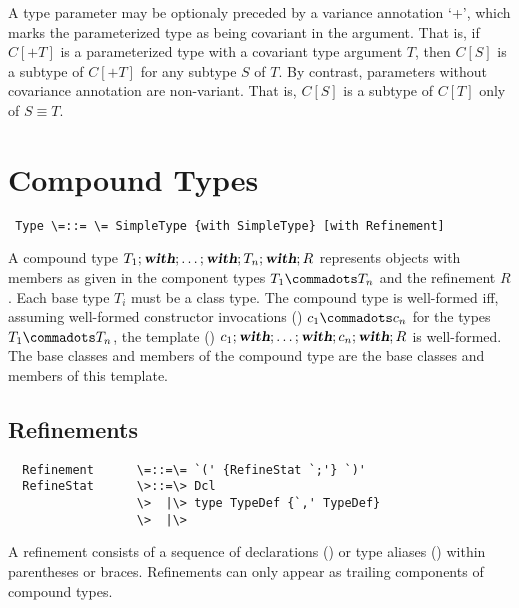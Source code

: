 \documentclass[11pt]{report}
\renewcommand{\todo}[1]{}
\begin{document}
A type parameter may be optionaly preceded by a variance annotation
`+', which marks the parameterized type as being covariant in the
argument. That is, if $C[+T]$ is a parameterized type with a covariant
type argument $T$, then $C[S]$ is a subtype of $C[+T]$ for any subtype
$S$ of $T$. By contrast, parameters without covariance annotation are
non-variant. That is, $C[S]$ is a subtype of $C[T]$ only of $S \equiv
T$.

\section{Compound Types}
\label{sec:compound-types}

\syntax\begin{verbatim} Type \=::= \= SimpleType {with SimpleType} [with Refinement]
\end{verbatim}

A compound type $T_1;\mbox{\sl\bfseries with};\ldots;\mbox{\sl\bfseries with};T_n;\mbox{\sl\bfseries with};R$ represents
objects with members as given in the component types $T_1 \commadots
T_n$ and the refinement $R$. Each base type $T_i$ must be a class
type.  The compound type is well-formed iff, assuming well-formed
constructor invocations () $c_1
\commadots c_n$ for the types $T_1 \commadots T_n$, the template
() $c_1;\mbox{\sl\bfseries with};\ldots;\mbox{\sl\bfseries with};c_n;\mbox{\sl\bfseries with};R$ is
well-formed. The base classes and members of the compound type are the
base classes and members of this template.

\todo{Relax this for type parameter bounds.}




\subsection{Refinements}
\label{sec:refinements}

\syntax\begin{verbatim}
  Refinement      \=::=\= `(' {RefineStat `;'} `)'
  RefineStat      \>::=\> Dcl
                  \>  |\> type TypeDef {`,' TypeDef}
                  \>  |\>
\end{verbatim}

A refinement consists of a sequence of declarations ()
or type aliases () within parentheses or
braces. Refinements can only appear as trailing components of compound
types.

\end{document}
